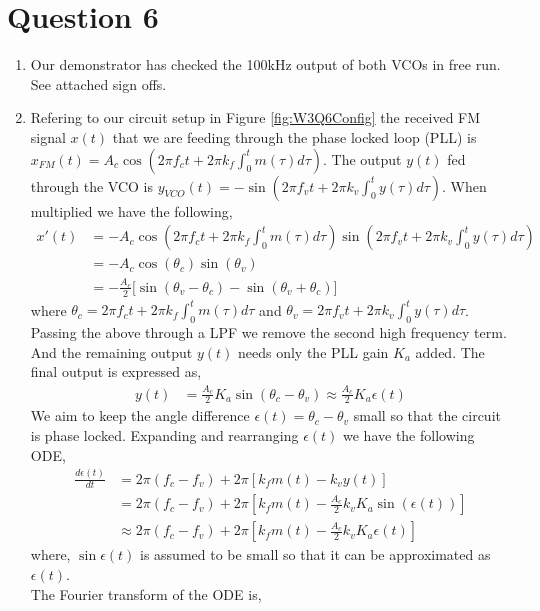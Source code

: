 \documentclass[11pt]{article}
\begin{document}
\section*{Question 6}
\begin{enumerate}[label=(\alph*)]
\item %
Our demonstrator has checked the 100kHz output of both VCOs in free run. See attached sign offs. 
\item %
Refering to our circuit setup in Figure \ref{fig:W3Q6Config} the received FM signal $x(t)$ that we are feeding through the phase locked loop (PLL) is $x_{FM}(t) = A_c \cos(2\pi f_c t + 2\pi k_f \int^t_0 m(\tau) d\tau)$. 
The output $y(t)$ fed through the VCO is $y_{VCO}(t) = -\sin(2\pi f_v t + 2\pi k_v \int^t_0 y(\tau)d\tau)$. When multiplied we have the following, 
\begin{align*}
    x'(t) &= -A_c \cos(2\pi f_c t + 2\pi k_f \int^t_0 m(\tau) d\tau) \sin(2\pi f_v t + 2\pi k_v \int^t_0 y(\tau)d\tau)\\
    &= -A_c \cos(\theta_c) \sin(\theta_v)\\
    &= -\frac{A_c}{2} \bigg[ \sin(\theta_v - \theta_c) - \sin(\theta_v + \theta_c) \bigg]
\end{align*}
where $\theta_c = 2\pi f_c t + 2\pi k_f \int^t_0 m(\tau) d\tau$ and $\theta_v = 2\pi f_v t + 2\pi k_v \int^t_0 y(\tau) d\tau$.\\
Passing the above through a LPF we remove the second high frequency term. And the remaining output $y(t)$ needs only the PLL gain $K_a$ added. The final output is expressed as,
\begin{align*}
    y(t) &= \frac{A_c}{2} K_a \sin(\theta_c - \theta_v) \approx \frac{A_c}{2} K_a \epsilon(t)
\end{align*}
We aim to keep the angle difference $\epsilon(t) = \theta_c - \theta_v$ small so that the circuit is phase locked. Expanding and rearranging $\epsilon(t)$ we have the following ODE, 
\begin{align*}
    \frac{d\epsilon(t)}{dt} &= 2\pi(f_c - f_v) + 2\pi[k_f m(t) - k_v y(t)]\\
    &= 2\pi(f_c - f_v) + 2\pi[k_f m(t) - \frac{A_c}{2} k_v K_a \sin(\epsilon(t))]\\
    &\approx 2\pi(f_c - f_v) + 2\pi[k_f m(t) - \frac{A_c}{2} k_v K_a \epsilon(t)]
\end{align*}
where, $\sin\epsilon(t)$ is assumed to be small so that it can be approximated as $\epsilon(t)$.\\ 
The Fourier transform of the ODE is, 

\end{enumerate}
\end{document}

